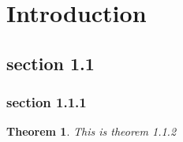 \documentclass[12 pt]{amsart}
\newtheorem{thm}[subsubsection]{Theorem}
\begin{document}
\section{Introduction}

\subsection{section 1.1}

\subsubsection{section 1.1.1}

\begin{thm}
This is theorem 1.1.2
\end{thm}
\end{document}
